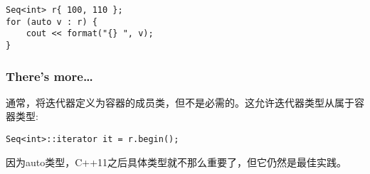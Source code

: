 \begin{lstlisting}[style=styleCXX]
Seq<int> r{ 100, 110 };
for (auto v : r) {
	cout << format("{} ", v);
}
\end{lstlisting}

\subsubsection{There's more…}

通常，将迭代器定义为容器的成员类，但不是必需的。这允许迭代器类型从属于容器类型:

\begin{lstlisting}[style=styleCXX]
Seq<int>::iterator it = r.begin();
\end{lstlisting}

因为auto类型，C++11之后具体类型就不那么重要了，但它仍然是最佳实践。





